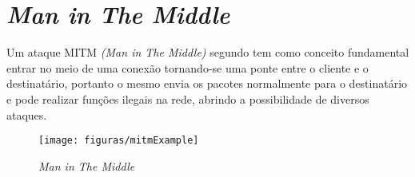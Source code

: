 
\section{\emph{Man in The Middle}}
\label{sec:2mitm}
\par Um ataque MITM \emph{(Man in The Middle)} segundo  tem como conceito fundamental entrar no meio de uma conex\~ao tornando-se uma ponte entre o cliente e o destinat\'ario, portanto o mesmo envia os pacotes normalmente para o destinat\'ario e pode realizar fun\c{c}\~oes ilegais na rede, abrindo a possibilidade de diversos ataques.

\begin{figure}[ht]
	\caption{\emph{Man in The Middle}}
	\centering
		\texttt{[image: figuras/mitmExample]}
\end{figure}

